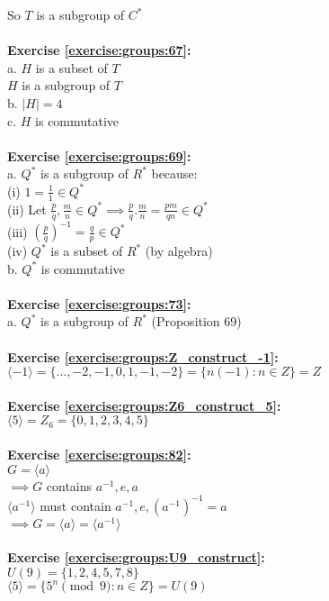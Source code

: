 So $T$ is a subgroup of $C^*$\\
\\
\textbf{Exercise \ref{exercise:groups:67}:}\\
a. $H$ is a subset of $T$\\
$H$ is a subgroup of $T$\\
b. $|H|=4$\\
c. $H$ is commutative\\
\\
\textbf{Exercise \ref{exercise:groups:69}:}\\
a. $Q^*$ is a subgroup of $R^*$ because:\\
(i) $1=\displaystyle\frac{1}{1}\in Q^*$\\
(ii) Let $\displaystyle\frac{p}{q},\frac{m}{n}\in Q^*\implies \frac{p}{q}.\frac{m}{n}=\frac{pm}{qn}\in Q^*$\\
(iii) $\displaystyle(\frac{p}{q})^{-1}=\frac{q}{p}\in Q^*$\\
(iv) $Q^*$ is a subset of $R^*$ (by algebra)\\
b. $Q^*$ is commutative\\
\\
\textbf{Exercise \ref{exercise:groups:73}:}\\
a. $Q^*$ is a subgroup of $R^*$ (Proposition 69)\\
\\
\textbf{Exercise \ref{exercise:groups:Z_construct_-1}:}\\
$\langle-1\rangle=\{...,-2,-1,0,1,-1,-2\}=\{n(-1):n\in Z\}=Z$\\
\\
\textbf{Exercise \ref{exercise:groups:Z6_construct_5}:}\\
$\langle 5\rangle=Z_6=\{0,1,2,3,4,5\}$\\
\\
\textbf{Exercise \ref{exercise:groups:82}:}\\
$G=\langle a\rangle$\\
$\implies G$ contains $a^{-1},e,a$\\
$\langle a^{-1}\rangle$ must contain $a^{-1},e,(a^{-1})^{-1}=a$\\
$\implies G=\langle a\rangle=\langle a^{-1}\rangle$\\
\\
\textbf{Exercise \ref{exercise:groups:U9_construct}:}\\
$U(9)=\{1,2,4,5,7,8\}$\\
$\langle 5\rangle=\{5^n\pmod{9}:n\in Z\}=U(9)$\\
